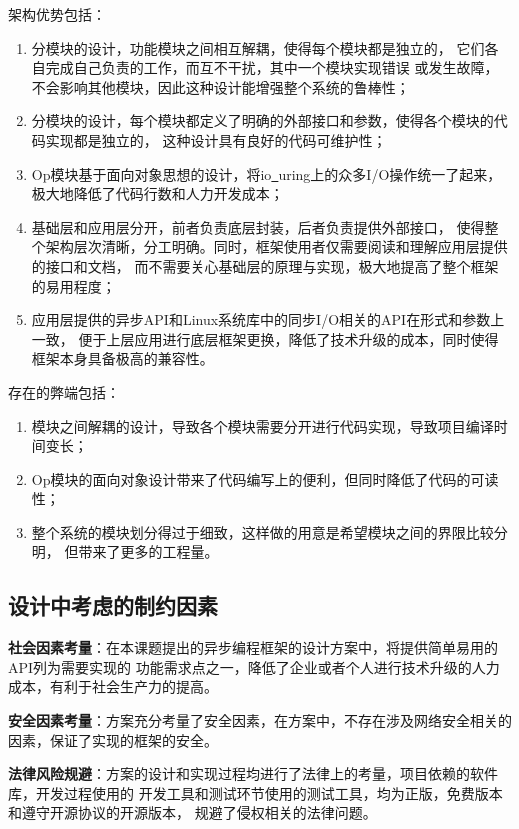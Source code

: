 \documentclass[supercite]{HustGraduPaper}
\theoremstyle{definition}
\begin{document}
架构优势包括：
\begin{enumerate}[label={(\arabic*)}]
  \item 分模块的设计，功能模块之间相互解耦，使得每个模块都是独立的，
    它们各自完成自己负责的工作，而互不干扰，其中一个模块实现错误
    或发生故障，不会影响其他模块，因此这种设计能增强整个系统的鲁棒性；
  \item 分模块的设计，每个模块都定义了明确的外部接口和参数，使得各个模块的代码实现都是独立的，
    这种设计具有良好的代码可维护性；
  \item Op模块基于面向对象思想的设计，将io\underline{~}uring上的众多I/O操作统一了起来，
    极大地降低了代码行数和人力开发成本；
  \item 基础层和应用层分开，前者负责底层封装，后者负责提供外部接口，
    使得整个架构层次清晰，分工明确。同时，框架使用者仅需要阅读和理解应用层提供的接口和文档，
    而不需要关心基础层的原理与实现，极大地提高了整个框架的易用程度；
  \item 应用层提供的异步API和Linux系统库中的同步I/O相关的API在形式和参数上一致，
    便于上层应用进行底层框架更换，降低了技术升级的成本，同时使得框架本身具备极高的兼容性。
\end{enumerate}

存在的弊端包括：
\begin{enumerate}[label={(\arabic*)}]
  \item 模块之间解耦的设计，导致各个模块需要分开进行代码实现，导致项目编译时间变长；
  \item Op模块的面向对象设计带来了代码编写上的便利，但同时降低了代码的可读性；
  \item 整个系统的模块划分得过于细致，这样做的用意是希望模块之间的界限比较分明，
    但带来了更多的工程量。
\end{enumerate}

\subsection{设计中考虑的制约因素}

\textbf{社会因素考量}：在本课题提出的异步编程框架的设计方案中，将提供简单易用的API列为需要实现的
功能需求点之一，降低了企业或者个人进行技术升级的人力成本，有利于社会生产力的提高。\par

\textbf{安全因素考量}：方案充分考量了安全因素，在方案中，不存在涉及网络安全相关的
因素，保证了实现的框架的安全。\par

\textbf{法律风险规避}：方案的设计和实现过程均进行了法律上的考量，项目依赖的软件库，开发过程使用的
开发工具和测试环节使用的测试工具，均为正版，免费版本和遵守开源协议的开源版本，
规避了侵权相关的法律问题。\par
\end{document}
